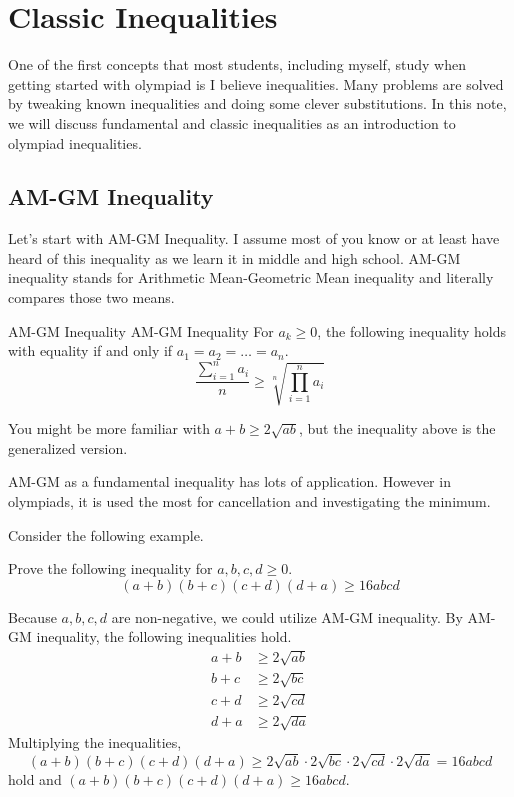 \documentclass[../main.tex]{subfiles}
\begin{document}
\section{Classic Inequalities}

One of the first concepts that most students, including myself,
study when getting started with olympiad is I believe inequalities.
Many problems are solved by tweaking known inequalities and doing
some clever substitutions. In this note, we will discuss fundamental
and classic inequalities as an introduction to olympiad inequalities.

\subsection{AM-GM Inequality}

Let's start with AM-GM Inequality. I assume most of you know or
at least have heard of this inequality as we learn it in middle and
high school. AM-GM inequality stands for Arithmetic Mean-Geometric
Mean inequality and literally compares those two means.

\begin{definition}
{AM-GM Inequality}
{AM-GM Inequality}
For $a_k \geq 0$, the following inequality holds with equality if
and only if $a_1 = a_2 = \dots = a_n$.
\[
\frac{ \sum_{i=1}^n a_i }{n} \geq
\sqrt[n]{ \prod_{i=1}^n a_i }
\]
\end{definition}

You might be more familiar with $a + b \geq 2 \sqrt{ab}$, but the
inequality above is the generalized version.

\begin{tip}
AM-GM as a fundamental inequality has lots of application. However
in olympiads, it is used the most for cancellation and investigating
the minimum.
\end{tip}

Consider the following example.

\begin{problem}{}{}
Prove the following inequality for $a, b, c, d \geq 0$.
\[
(a + b)(b + c)(c + d)(d + a) \geq 16abcd
\]
\end{problem}
\begin{solution}
Because $a, b, c, d$ are non-negative, we could utilize AM-GM
inequality. By AM-GM inequality, the following inequalities hold.
\begin{align*}
    a + b &\geq 2 \sqrt{ab} \\
    b + c &\geq 2 \sqrt{bc} \\
    c + d &\geq 2 \sqrt{cd} \\
    d + a &\geq 2 \sqrt{da}
\end{align*}
Multiplying the inequalities,
\[
(a + b)(b + c)(c + d)(d + a) \geq 
2 \sqrt{ab} \cdot 2 \sqrt{bc} \cdot 
2 \sqrt{cd} \cdot 2 \sqrt{da} = 16abcd
\]
hold and $(a + b)(b + c)(c + d)(d + a) \geq 16abcd$.
\end{solution}
\end{document}

